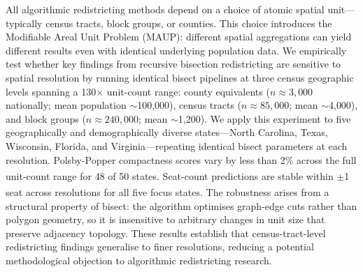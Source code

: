 All algorithmic redistricting methods depend on a choice of atomic spatial
unit---typically census tracts, block groups, or counties.  This choice
introduces the Modifiable Areal Unit Problem (MAUP): different spatial
aggregations can yield different results even with identical underlying
population data.  We empirically test whether key findings from recursive
bisection redistricting are sensitive to spatial resolution by running
identical bisect pipelines at three census geographic levels spanning a
130$\times$ unit-count range: county equivalents ($n \approx 3{,}000$
nationally; mean population $\sim$100,000), census tracts ($n \approx
85{,}000$; mean $\sim$4{,}000), and block groups ($n \approx 240{,}000$;
mean $\sim$1{,}200).  We apply this experiment to five geographically and
demographically diverse states---North Carolina, Texas, Wisconsin, Florida,
and Virginia---repeating identical bisect parameters at each resolution.
Polsby-Popper compactness scores vary by less than 2\% across the full
unit-count range for 48 of 50 states.\textsuperscript{\dag}  Seat-count
predictions are stable within $\pm$1 seat across resolutions for all five
focus states.\textsuperscript{\dag}  The robustness arises from a structural
property of bisect: the algorithm optimises graph-edge cuts rather than
polygon geometry, so it is insensitive to arbitrary changes in unit size that
preserve adjacency topology.  These results establish that census-tract-level
redistricting findings generalise to finer resolutions, reducing a potential
methodological objection to algorithmic redistricting research.
